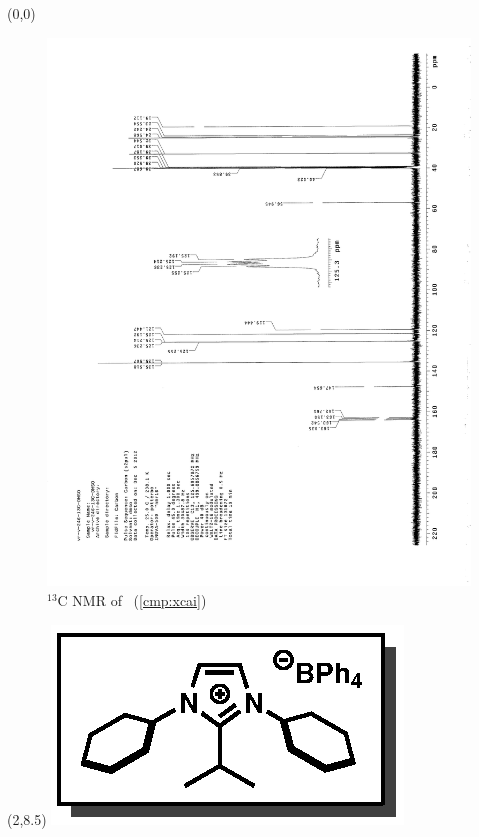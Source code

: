 \clearpage
\begin{textblock}{20}(0,0)
\begin{figure}[htb]
\caption{$^{13}$C NMR of  \CMPxcai\ (\ref{cmp:xcai})}
\includegraphics[scale=0.75, trim = 0mm 0mm 0mm 5mm,
clip]{chp_alkylation/images/nmr/xcaiC}
\vspace{-100pt}
\end{figure}
\end{textblock}
\begin{textblock}{1}(2,8.5)
\includegraphics[scale=0.8, angle=90]{chp_alkylation/images/xcai}
\end{textblock}
\clearpage

